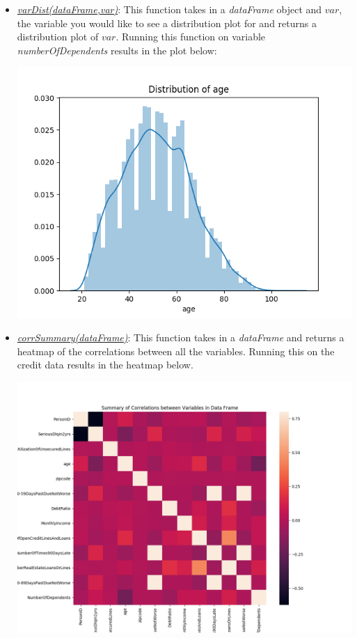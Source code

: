 \documentclass[letterpaper,12pt]{article}
\begin{document}
\begin{enumerate}
\begin{itemize}
\item \underline{\textit{varDist(dataFrame,var)}}: This function takes in a \textit{dataFrame} object and $var$, the variable you would like to see a distribution plot for and returns a distribution plot of $var$. Running this function on variable \textit{numberOfDependents} results in the plot below:
\begin{center}
\includegraphics[scale=.5]{varDist.png}
\end{center}

\item \underline{\textit{corrSummary(dataFrame)}}: This function takes in a \textit{dataFrame} and returns a heatmap of the correlations between all the variables. Running this on the credit data results in the heatmap below.
\begin{center}
\includegraphics[scale=.6]{corrSummary.png}
\end{center}


\end{itemize}
\end{enumerate}
\end{document}
